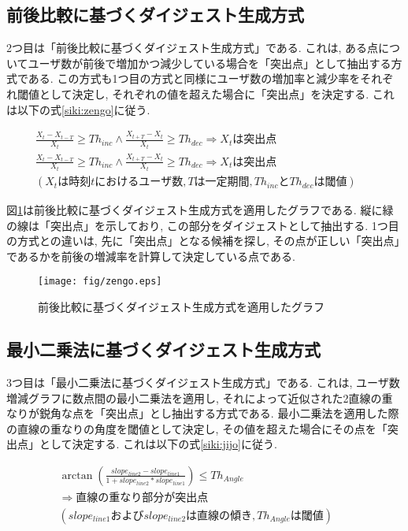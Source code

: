 \subsection{前後比較に基づくダイジェスト生成方式}\label{subsec:pro-zengo}
2つ目は「前後比較に基づくダイジェスト生成方式」である. これは, ある点についてユーザ数が前後で増加かつ減少している場合を「突出点」として抽出する方式である. この方式も1つ目の方式と同様にユーザ数の増加率と減少率をそれぞれ閾値として決定し, それぞれの値を超えた場合に「突出点」を決定する. これは以下の式\ref{siki:zengo}に従う.

\begin{eqnarray}
  \frac{X_{t}-X_{t-T}}{X_{t}} \geq Th_{inc} \wedge \frac{X_{t+T}-X_{t}}{X_{t}} \geq Th_{dec} \Rightarrow X_{t}は突出点 \nonumber \\
  \frac{X_{t}-X_{t-T}}{X_{t}} \geq Th_{inc} \wedge \frac{X_{t+T}-X_{t}}{X_{t}} \geq Th_{dec} \Rightarrow X_{t}は突出点 \nonumber \\
  (X_{t}は時刻tにおけるユーザ数, Tは一定期間, Th_{inc}とTh_{dec}は閾値) &&
  \label{siki:zengo}
\end{eqnarray}

図\ref{fig:zengo}は前後比較に基づくダイジェスト生成方式を適用したグラフである. 縦に緑の線は「突出点」を示しており, この部分をダイジェストとして抽出する. 1つ目の方式との違いは, 先に「突出点」となる候補を探し, その点が正しい「突出点」であるかを前後の増減率を計算して決定している点である.

\begin{figure}[h]
  \centering
  \texttt{[image: fig/zengo.eps]}
  \caption{前後比較に基づくダイジェスト生成方式を適用したグラフ}
  \label{fig:zengo}
\end{figure}

\newpage

\subsection{最小二乗法に基づくダイジェスト生成方式}\label{subsec:pro-jijo}
3つ目は「最小二乗法に基づくダイジェスト生成方式」である. これは, ユーザ数増減グラフに数点間の最小二乗法を適用し, それによって近似された2直線の重なりが鋭角な点を「突出点」とし抽出する方式である. 最小二乗法を適用した際の直線の重なりの角度を閾値として決定し, その値を超えた場合にその点を「突出点」として決定する. これは以下の式\ref{siki:jijo}に従う.

\begin{eqnarray}
  \arctan \left(\frac{slope_{line2} - slope_{line1}}{1+slope_{line2}*slope_{line1}}\right) \leq Th_{Angle} \nonumber \\
  \Rightarrow 直線の重なり部分が突出点 \nonumber \\
  (slope_{line1}およびslope_{line2}は直線の傾き, Th_{Angle}は閾値) &&
  \label{siki:jijo}
\end{eqnarray}

